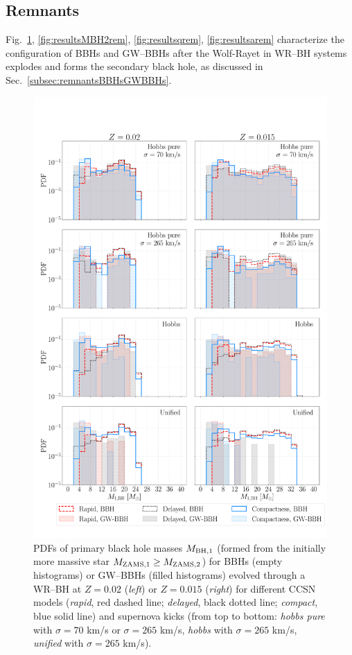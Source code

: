 \documentclass[a4paper,titlepage]{book}     	%
\begin{document}
\begin{appendices}
\subsection{Remnants}\label{subapp:remnantsGWBBH}
Fig.\ \ref{fig:resultsMBH1rem}, \ref{fig:resultsMBH2rem}, \ref{fig:resultsqrem}, \ref{fig:resultsarem} characterize the configuration of BBHs and GW--BBHs after the Wolf-Rayet in WR--BH systems explodes and forms the secondary black hole, as discussed in Sec.\ \ref{subsec:remnantsBBHsGWBBHs}.

\begin{figure}
	\centering
	\includegraphics[width=\textwidth]{./images/remM1.pdf}	
	\caption{PDFs of primary black hole masses $M_{\rm BH,1}$ (formed from the initially more massive star $M_{\rm ZAMS, 1} \geq M_{\rm ZAMS, 2}$) for BBHs (empty histograms) or GW--BBHs (filled histograms) evolved through a WR--BH at $Z=0.02$ (\emph{left}) or $Z=0.015$ (\emph{right}) for different CCSN models (\emph{rapid}, red dashed line; \emph{delayed}, black dotted line; \emph{compact}, blue solid line) and supernova kicks (from top to bottom: \emph{hobbs pure} with $\sigma = 70$ km/s or $\sigma = 265$ km/s, \emph{hobbs} with $\sigma = 265$ km/s, \emph{unified} with $\sigma = 265$ km/s).}\label{fig:resultsMBH1rem}
\end{figure}


\end{appendices}
\end{document}
